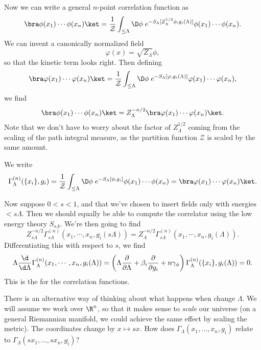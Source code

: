 \documentclass[a4paper]{article}
\begin{document}
Now we can write a general $n$-point correlation function as
\[
  \bra \phi(x_1) \cdots \phi(x_n)\ket = \frac{1}{\mathcal{Z}} \int_{\leq \Lambda} \D \phi\; e^{-S_\Lambda[Z_\Lambda^{1/2} \phi, g_i(\Lambda)]} \phi(x_1) \cdots \phi(x_n).
\]
We can invent a canonically normalized field
\[
  \varphi(x) = \sqrt{Z_\Lambda} \phi,
\]
so that the kinetic term looks right. Then defining
\[
  \bra \varphi(x_1) \cdots \varphi(x_n)\ket = \frac{1}{\mathcal{Z}}\int_{\leq \Lambda} \D \phi\; e^{-S_\Lambda[\varphi, g_i(\Lambda)]} \varphi(x_1) \cdots \varphi(x_n),
\]
we find
\[
  \bra \phi(x_1) \cdots \phi(x_n)\ket = Z_\Lambda^{-n/2} \bra \varphi(x_1) \cdots \varphi(x_n)\ket.
\]
Note that we don't have to worry about the factor of $Z_\Lambda^{1/2}$ coming from the scaling of the path integral measure, as the partition function $\mathcal{Z}$ is scaled by the same amount.
\begin{defi}
  We write
  \[
    \Gamma_\Lambda^{(n)} (\{x_i\}, g_i) = \frac{1}{\mathcal{Z}}\int_{\leq \Lambda} \D \phi\; e^{-S_\Lambda[\phi, g_i]} \phi(x_1) \cdots \phi(x_n) = \bra \varphi(x_1) \cdots \varphi(x_n)\ket.
  \]
\end{defi}
Now suppose $0 < s < 1$, and that we've chosen to insert fields only with energies $< s \Lambda$. Then we should equally be able to compute the correlator using the low energy theory $S_{s\Lambda}$. We're then going to find
\[
  Z^{-n/2}_{s\Lambda} \Gamma_{s\Lambda}^{(n)} (x_1, \cdots, x_n, g_i(s\Lambda)) = Z_\Lambda^{-n/2} \Gamma^{(n)}_{s\Lambda} (x_1, \cdots, x_n, g_i(\Lambda)).
\]
Differentiating this with respect to $s$, we find
\[
  \Lambda \frac{\d}{\d \Lambda} \Gamma_\Lambda^{(n)}(x_1, \cdots, x_n, g_i(\Lambda)) = \left(\Lambda \frac{\partial}{\partial \Lambda} + \beta_i \frac{\partial}{\partial g_i} + n \gamma_\phi\right) \Gamma_\Lambda^{(n)} ( \{x_i\}, g_i(\Lambda)) = 0.
\]
This is the  for the correlation functions.

There is an alternative way of thinking about what happens when change $\Lambda$. We will assume we work over $\R^n$, so that it makes sense to \emph{scale} our universe (on a general Riemannian manifold, we could achieve the same effect by scaling the metric). The coordinates change by $x \mapsto sx$. How does $\Gamma_\Lambda(x_1, \ldots, x_n, g_i)$ relate to $\Gamma_\Lambda(s x_1, \ldots, s x_n, g_i)$?
\end{document}
